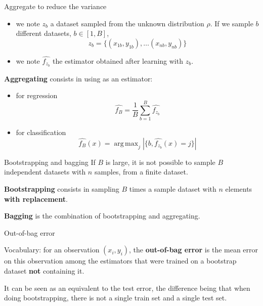 \documentclass[usenames,dvipsnames]{beamer}
\DeclareMathOperator*{\argmax}{arg\,max}
\begin{document}
\begin{frame}{Aggregate to reduce the variance}
    \begin{itemize}
	\item we note $z_b$ a dataset sampled from the unknown distribution $ \rho$. If we sample $b$ different datasets, $b\in [1, B]$, 
	    \begin{equation}
		z_b = \{(x_{1b}, y_{1b}), \dots (x_{nb}, y_{nb})\}
	    \end{equation}
	\item we note $ \hat{f_{z_b}}$ the estimator obtained after learning with $ z_b$.
    \end{itemize}
    \textbf{{Aggregating}} consists in using as an estimator:
    \begin{itemize}
        \item for regression
	    \begin{equation}
		\hat{f_B} = \frac{1}{B} \sum^{B}_{b=1} \hat{f_{z_b}}
	    \end{equation}
	\item for classification
	    \begin{equation}
		\hat{f_B}(x) = \argmax_{j} | \{ b, \hat{f_{z_b}}(x)=j \}|
	    \end{equation}
    \end{itemize}
\end{frame}

\begin{frame}{Bootstrapping and bagging}
    If $B$ is large, it is not possible to sample $B$ independent datasets with $n$ samples, from a finite dataset.

    \textbf{{Bootstrapping}} consists in sampling $B$ times a sample dataset with $n$ elements \textbf{{with replacement}}.
    
    \textbf{{Bagging}} is the combination of bootstrapping and aggregating.
    
\end{frame}

\begin{frame}{Out-of-bag error}
    
    Vocabulary: for an observation $(x_i, y_i)$, the \textbf{{out-of-bag error}}  is the mean error on this observation among the estimators that were trained on a bootstrap dataset \textbf{{not}} containing it.

    It can be seen as an equivalent to the test error, the difference being that when doing bootstrapping, there is not a single train set and a single test set.
\end{frame}
\end{document}
